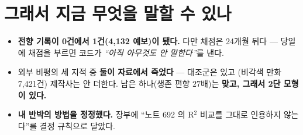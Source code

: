 \documentclass[10pt,a4paper]{article}
\begin{document}
\section{그래서 지금 무엇을 말할 수 있나}

\begin{itemize}
\item \textbf{전향 기록이 0건에서 1건(4{,}132 예보)이 됐다.} 다만 채점은 24개월
      뒤다 --- 당일에 채점을 부르면 코드가 \emph{``아직 아무것도 안 말한다''}를 낸다.
\item 외부 비평의 세 지적 중 \textbf{둘이 자료에서 죽었다} --- 대조군은 있고
      (비각색 만화 7{,}421건) 제작사는 안 더한다. 남은 하나(생존 편향 $27$배)는
      \textbf{맞고, 그래서 2단 모형이 있다.}
\item \textbf{내 반박의 방법을 정정했다.} 장부에 ``노트 692 의 R$^2$ 비교를 그대로
      인용하지 않는다''를 결정 규칙으로 달았다.
\end{itemize}
\end{document}
